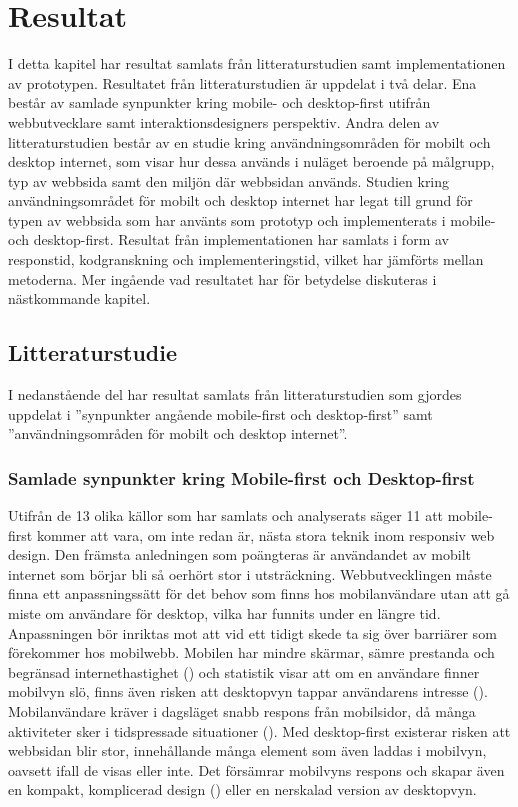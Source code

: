 \documentclass[11pt]{article}
\begin{document}
\newpage

\section{Resultat}

I detta kapitel har resultat samlats från litteraturstudien samt implementationen av prototypen.
Resultatet från litteraturstudien är uppdelat i två delar. Ena består av samlade synpunkter kring mobile- och desktop-first utifrån webbutvecklare samt interaktionsdesigners perspektiv. Andra delen av litteraturstudien består av en studie kring användningsområden för mobilt och desktop internet, som visar hur dessa används i nuläget beroende på målgrupp, typ av webbsida samt den miljön där webbsidan används. Studien kring användningsområdet för mobilt och desktop internet har legat till grund för typen av webbsida som har använts som prototyp och implementerats i mobile- och desktop-first. Resultat från implementationen har samlats i form av responstid, kodgranskning och implementeringstid, vilket har jämförts mellan metoderna. Mer ingående vad resultatet har för betydelse diskuteras i nästkommande kapitel.


\subsection{Litteraturstudie}
I nedanstående del har resultat samlats från litteraturstudien som gjordes uppdelat i ''synpunkter angående mobile-first och desktop-first'' samt ''användningsområden för mobilt och desktop internet''.
\subsubsection{Samlade synpunkter kring Mobile-first och Desktop-first}
Utifrån de 13 olika källor som har samlats och analyserats säger 11 att mobile-first kommer att vara, om inte redan är, nästa stora teknik inom responsiv web design. Den främsta anledningen som poängteras är användandet av mobilt internet som börjar bli så oerhört stor i utsträckning. Webbutvecklingen måste finna ett anpassningssätt för det behov som finns hos mobilanvändare utan att gå miste om användare för desktop, vilka har funnits under en längre tid. Anpassningen bör inriktas mot att vid ett tidigt skede ta sig över barriärer som förekommer hos mobilwebb. Mobilen har mindre skärmar, sämre prestanda och begränsad internethastighet (\cite{themepartner}) och statistik visar att om en användare finner mobilvyn slö, finns även risken att desktopvyn tappar användarens intresse (\cite{zurbword}). Mobilanvändare kräver i dagsläget snabb respons från mobilsidor, då många aktiviteter sker i tidspressade situationer (\cite{techradar}). Med desktop-first existerar risken att webbsidan blir stor, innehållande många element som även laddas i mobilvyn, oavsett ifall de visas eller inte. Det försämrar mobilvyns respons och skapar även en kompakt, komplicerad design (\cite{zurbword}) eller en nerskalad version av desktopvyn.
\end{document}
